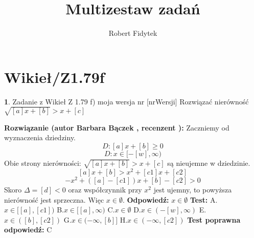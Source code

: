 \documentclass[12pt, a4paper]{article}
\title{Multizestaw zadań}
\author{Robert Fidytek}
\date{}
\theoremstyle{definition} %
\newtheorem{zad}{}
\newcommand{\kategoria}[1]{\section{#1}} %
\newcommand{\zadStart}[1]{\begin{zad}#1\newline} %
\newcommand{\zadStop}{\end{zad}}   %
\newcommand{\rozwStart}[2]{\noindent \textbf{Rozwiązanie (autor #1 , recenzent #2): }\newline} %
\newcommand{\rozwStop}{\newline}                                            %
\newcommand{\odpStart}{\noindent \textbf{Odpowiedź:}\newline}    %
\newcommand{\odpStop}{\newline}                                             %
\newcommand{\testStart}{\noindent \textbf{Test:}\newline} %
\newcommand{\testStop}{\newline} %
\newcommand{\kluczStart}{\noindent \textbf{Test poprawna odpowiedź:}\newline} %
\newcommand{\kluczStop}{\newline} %
\begin{document}
\maketitle


\kategoria{Wikieł/Z1.79f}
\zadStart{Zadanie z Wikieł Z 1.79 f) moja wersja nr [nrWersji]}
Rozwiązać nierówność $\sqrt{[a]x+[b]}>x+[c]$
\zadStop
\rozwStart{Barbara Bączek}{}
Zaczniemy od wyznaczenia dziedziny.
$$D: [a]x+[b] \geq 0$$
$$D: x \in [-[w], \infty)$$
Obie strony nierówności: $\sqrt{[a]x+[b]}>x+[c]$ są nieujemne w dziedzinie.
$$[a]x+[b]>x^2+ [c1]x + [c2]$$
$$-x^2 + ([a]-[c1])x +[b]-[c2]>0$$
Skoro $\Delta= [d]<0$ oraz współczynnik przy $x^2$ jest ujemny, to powyższa nierówność jest sprzeczna. Więc $x \in \emptyset$. 
\rozwStop
\odpStart
$x \in \emptyset$
\odpStop
\testStart
A.$x \in [[a],[c1])$
B.$x \in [[a],\infty)$
C.$x \in \emptyset$
D.$x \in (-[w],\infty)$
E.$x \in  ([b],[c2])$
G.$x \in (-\infty,[b]]$
H.$x \in (-\infty,[c2])$
\testStop
\kluczStart
C
\kluczStop
\end{document}
